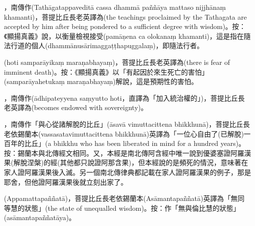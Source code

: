 \startitemgroup[noteitems]
\item{}，南傳作(Tathāgatappaveditā cassa dhammā paññāya mattaso nijjhānaṃ khamanti)，菩提比丘長老英譯為(the teachings proclaimed by the Tathagata are accepted by him after being pondered to a sufficient degree with wisdom)。按：《顯揚真義》說，以衡量檢視接受(pamāṇena ca olokanaṃ khamanti)，這是指在隨法行道的個人(dhammānusārimaggaṭṭhapuggalaṃ)，即隨法行者。
\stopitemgroup

\startitemgroup[noteitems]
\item{}(hoti samparāyikaṃ maraṇabhayaṃ)，菩提比丘長老英譯為(there is fear of imminent death)。按：《顯揚真義》以「有起因於來生死亡的害怕」(samparāyahetukaṃ maraṇabhayaṃ)解說，這是預期性的害怕。
\stopitemgroup

\startitemgroup[noteitems]
\item{}，南傳作(ādhipateyyena saṃyutto hoti，直譯為「加入統治權的」)，菩提比丘長老英譯為(becomes endowed with sovereignty)。
\stopitemgroup

\startitemgroup[noteitems]
\item{}，南傳作「與心從諸解脫的比丘」(āsavā vimuttacittena bhikkhunā)，菩提比丘長老依錫蘭本(vassasatavimuttacittena bhikkhunā)英譯為「一位心自由了(已解脫)一百年的比丘」(a bhikkhu who has been liberated in mind for a hundred years)。按：錫蘭本與北傳經文相同。又，本經是南北傳阿含經中唯一說到優婆塞證阿羅漢果(解脫涅槃)的經(其他都只說證阿那含果)，但本經說的是頻死的情況，意味著在家人證阿羅漢果後入滅。另一個南北傳律典都記載在家人證阿羅漢果的例子，那是耶舍，但他證阿羅漢果後就立刻出家了。
\stopitemgroup

\startitemgroup[noteitems]
\item{}(Appamattapaññatā)，菩提比丘長老依錫蘭本(Asāmantapaññatā)英譯為「無同等慧的狀態」(the state of unequalled wisdom)。按：作「無與倫比慧的狀態」(asāmantapaññatāya)。
\stopitemgroup

